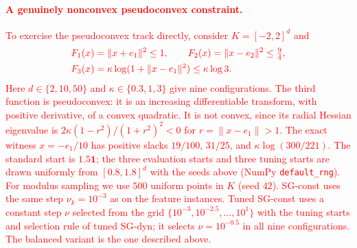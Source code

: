 \documentclass[]{interact}
\theoremstyle{plain}
\theoremstyle{definition}
\theoremstyle{remark}
\begin{document}
\paragraph*{\textcolor{red}{A genuinely nonconvex pseudoconvex constraint.}}
\leavevmode\textcolor{red}{To exercise the pseudoconvex track directly, consider $K=[-2,2]^d$ and}
\begin{equation}\label{eq:logball-test}\textcolor{red}{
\begin{aligned}
 F_1(x)&=\|x+e_1\|^2\le1,\qquad
 F_2(x)=\|x-e_2\|^2\le\tfrac94,\\
 F_3(x)&=\kappa\log(1+\|x-e_1\|^2)\le \kappa\log3.
\end{aligned}
}\end{equation}
\leavevmode\textcolor{red}{Here $d\in\{2,10,50\}$ and $\kappa\in\{0.3,1,3\}$ give nine configurations.
The third function is pseudoconvex: it is an increasing differentiable
transform, with positive derivative, of a convex quadratic. It is not
convex, since its radial Hessian eigenvalue is
$2\kappa(1-r^2)/(1+r^2)^2<0$ for $r=\|x-e_1\|>1$.
The exact witness $x=-e_1/10$ has positive slacks
$19/100$, $31/25$, and $\kappa\log(300/221)$.
The standard start is $1.5\mathbf1$; the three evaluation starts and three
tuning starts are drawn uniformly from $[0.8,1.8]^d$ with the seeds above
(NumPy \texttt{default\_rng}).
For modulus sampling we use $500$ uniform points in $K$ (seed $42$).
SG-const uses the same step $\nu_k=10^{-3}$ as on the feature instances. Tuned
SG-const uses a constant step $\nu$ selected from the grid
$\{10^{-3},10^{-2.5},\ldots,10^1\}$ with the tuning starts and selection rule of
tuned SG-dyn; it selects $\nu=10^{-0.5}$ in all nine configurations. The balanced
variant is the one described above.}
\end{document}
